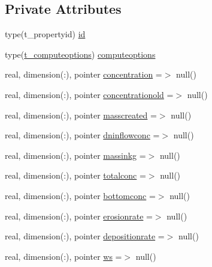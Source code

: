 \subsection*{Private Attributes}
\begin{DoxyCompactItemize}
\item 
type(t\+\_\+propertyid) \mbox{\hyperlink{structmodulereservoirs_1_1t__property_ac6e273cdb3c6238f07822767275f9fd2}{id}}
\item 
type(\mbox{\hyperlink{structmodulereservoirs_1_1t__computeoptions}{t\+\_\+computeoptions}}) \mbox{\hyperlink{structmodulereservoirs_1_1t__property_adeb264814c935bfeb5df1586fd665056}{computeoptions}}
\item 
real, dimension(\+:), pointer \mbox{\hyperlink{structmodulereservoirs_1_1t__property_a3b2a1f0cca27101e46d32294e7811940}{concentration}} =$>$ null()
\item 
real, dimension(\+:), pointer \mbox{\hyperlink{structmodulereservoirs_1_1t__property_a10595736763264cff24edd7666938244}{concentrationold}} =$>$ null()
\item 
real, dimension(\+:), pointer \mbox{\hyperlink{structmodulereservoirs_1_1t__property_a5cd1395a02bdfde7b27e770d02a62b44}{masscreated}} =$>$ null()
\item 
real, dimension(\+:), pointer \mbox{\hyperlink{structmodulereservoirs_1_1t__property_acb56a2036dc6da27e678273ba1c67c5c}{dninflowconc}} =$>$ null()
\item 
real, dimension(\+:), pointer \mbox{\hyperlink{structmodulereservoirs_1_1t__property_ac3b2bf370b0ffc45ef22ed29de9def46}{massinkg}} =$>$ null()
\item 
real, dimension(\+:), pointer \mbox{\hyperlink{structmodulereservoirs_1_1t__property_a77c55da4496b663b2d206c7c5f1ddef8}{totalconc}} =$>$ null()
\item 
real, dimension(\+:), pointer \mbox{\hyperlink{structmodulereservoirs_1_1t__property_ae59e46173a3ed69ad5a25232c01aa812}{bottomconc}} =$>$ null()
\item 
real, dimension(\+:), pointer \mbox{\hyperlink{structmodulereservoirs_1_1t__property_a72078f9d5ca7212c2b9b2871dbb5a05d}{erosionrate}} =$>$ null()
\item 
real, dimension(\+:), pointer \mbox{\hyperlink{structmodulereservoirs_1_1t__property_a3a955cd42f7f9d3ca7aa546b29d441bb}{depositionrate}} =$>$ null()
\item 
real, dimension(\+:), pointer \mbox{\hyperlink{structmodulereservoirs_1_1t__property_aac7eb5932dc99f085676598b3657dc85}{ws}} =$>$ null()
\item 

\end{DoxyCompactItemize}

